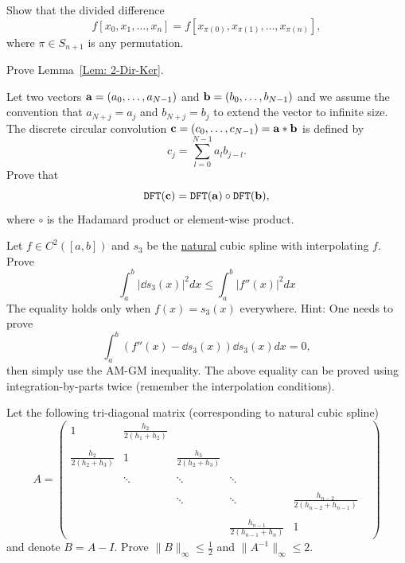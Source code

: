 \begin{problem}
    Show that the divided difference $$f[x_0, x_1,\dots, x_n] = f[x_{\pi(0)}, x_{\pi(1)},\dots, x_{\pi(n)}],$$ where $\pi\in S_{n+1}$ is any permutation.
\end{problem}
\begin{problem}
\label{Prb: 2-Theo-6}
    Prove Lemma~\ref{Lem: 2-Dir-Ker}.
\end{problem}
\begin{problem}
    Let two vectors $\mathbf a = (a_0,\dots, a_{N-1})$ and $\mathbf b = (b_0, \dots, b_{N-1})$ and we assume the convention that $a_{N + j} = a_j$ and $b_{N+j} = b_j$ to extend the vector to infinite size. The discrete circular convolution $\mathbf c = (c_0,\dots, c_{N-1}) = \mathbf a\ast \mathbf b$ is defined by 
$$c_j = \sum_{l = 0}^{N-1} a_l b_{j - l}.$$
Prove that 
$$\textup{\texttt{DFT}}(\mathbf c) = \textup{\texttt{DFT}}(\mathbf a)\circ \textup{\texttt{DFT}}(\mathbf b),$$
where $\circ$ is the Hadamard product or element-wise product.
\end{problem}
\begin{problem} Let $f\in C^2([a, b])$ and $s_3$ be the \underline{natural} cubic spline with interpolating $f$. Prove 
    \begin{equation}
        \int_a^b |\dd{s_3}(x)|^2 dx \le \int_{a}^b |f''(x)|^2 dx 
    \end{equation}
    The equality holds only when $f(x) = s_3(x)$ everywhere.
    Hint: One needs to prove 
    \begin{equation}
        \int_a^b (f''(x) - \dd{s_3}(x)) \dd{s_3}(x) dx = 0,
    \end{equation}
    then simply use the AM-GM inequality. The above equality can be proved using integration-by-parts twice (remember the interpolation conditions).
\end{problem}
\begin{problem}
    Let the following tri-diagonal matrix (corresponding to natural cubic spline)
    $$A = \begin{pmatrix}
        1 & \frac{h_{2}}{2(h_1 + h_{2})} & \\\\
        \frac{h_2}{2(h_2 + h_{3})} & 1 & \frac{h_{3}}{2(h_2 + h_{3})} & \\\\
        &\ddots &\ddots &  \ddots & \\ \\
        &&\ddots &\ddots &  \frac{h_{n-2}}{2(h_{n-2} + h_{n-1})} & \\ \\
        &&& \frac{h_{n-1}}{2(h_{n-1} + h_{n})} & 1&
    \end{pmatrix} $$
    and denote $B = A - I$. Prove $\|B\|_{\infty} \le \frac{1}{2}$ and $\|A^{-1}\|_{\infty}\le 2$. 
\end{problem}

